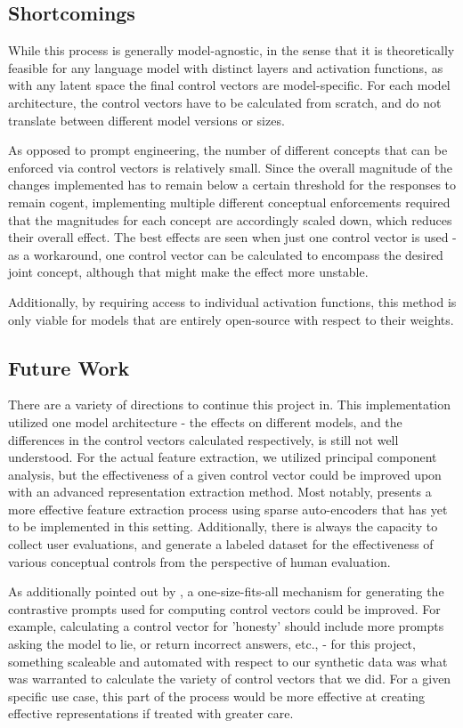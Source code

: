 \documentclass[11pt,a4paper]{article}
\begin{document}
\subsection{Shortcomings}
While this process is generally model-agnostic, in the sense that it is theoretically feasible for any language model with distinct layers and activation functions, as with any latent space the final control vectors are model-specific. For each model architecture, the control vectors have to be calculated from scratch, and do not translate between different model versions or sizes. 

As opposed to prompt engineering, the number of different concepts that can be enforced via control vectors is relatively small. Since the overall magnitude of the changes implemented has to remain below a certain threshold for the responses to remain cogent, implementing multiple different conceptual enforcements required that the magnitudes for each concept are accordingly scaled down, which reduces their overall effect. The best effects are seen when just one control vector is used - as a workaround, one control vector can be calculated to encompass the desired joint concept, although that might make the effect more unstable.

Additionally, by requiring access to individual activation functions, this method is only viable for models that are entirely open-source with respect to their weights. 

\subsection{Future Work}
There are a variety of directions to continue this project in. This implementation utilized one model architecture - the effects on different models, and the differences in the control vectors calculated respectively, is still not well understood. For the actual feature extraction, we utilized principal component analysis, but the effectiveness of a given control vector could be improved upon with an advanced representation extraction method. Most notably, \cite{bricken2023towards} presents a more effective feature extraction process using sparse auto-encoders that has yet to be implemented in this setting. Additionally, there is always the capacity to collect user evaluations, and generate a labeled dataset for the effectiveness of various conceptual controls from the perspective of human evaluation. 

As additionally pointed out by \cite{vogel2024repeng}, a one-size-fits-all mechanism for generating the contrastive prompts used for computing control vectors could be improved. For example, calculating a control vector for 'honesty' should include more prompts asking the model to lie, or return incorrect answers, etc., - for this project, something scaleable and automated with respect to our synthetic data was what was warranted to calculate the variety of control vectors that we did. For a given specific use case, this part of the process would be more effective at creating effective representations if treated with greater care.
\end{document}
